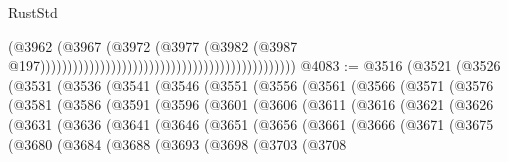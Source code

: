 \begin{lexlean}{RustStd}
\begin{coremodule}
                                                                                      (@3962
                                                                                        (@3967
                                                                                          (@3972
                                                                                            (@3977
                                                                                              (@3982
                                                                                                (@3987
                                                                                                  @197)))))))))))))))))))))))))))))))))))))))))))))))
@4083 := @3516
    (@3521
      (@3526
        (@3531
          (@3536
            (@3541
              (@3546
                (@3551
                  (@3556
                    (@3561
                      (@3566
                        (@3571
                          (@3576
                            (@3581
                              (@3586
                                (@3591
                                  (@3596
                                    (@3601
                                      (@3606
                                        (@3611
                                          (@3616
                                            (@3621
                                              (@3626
                                                (@3631
                                                  (@3636
                                                    (@3641
                                                      (@3646
                                                        (@3651
                                                          (@3656
                                                            (@3661
                                                              (@3666
                                                                (@3671
                                                                  (@3675
                                                                    (@3680
                                                                      (@3684
                                                                        (@3688
                                                                          (@3693
                                                                            (@3698
                                                                              (@3703
                                                                                (@3708

\end{coremodule}
\end{lexlean}
